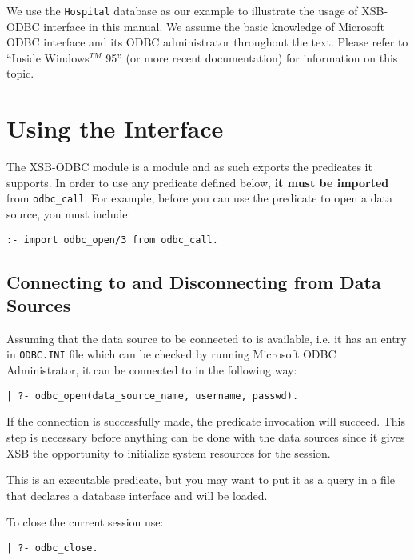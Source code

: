 We use the {\tt Hospital} database as our example to illustrate 
the usage of XSB-ODBC interface in this manual. We assume the basic 
knowledge of Microsoft ODBC interface and its ODBC administrator 
throughout the text.  Please refer to ``Inside Windows$^{TM}$ 95''
(or more recent documentation) for information on this topic.

\section{Using the Interface}

The XSB-ODBC module is a module and as such exports the predicates it
supports.  In order to use any predicate defined below, {\bf it must be
imported} from {\tt odbc\_call}.  For example, before you can use the
predicate to open a data source, you must include:

\begin{verbatim}
:- import odbc_open/3 from odbc_call.
\end{verbatim}

\subsection{Connecting to and Disconnecting from Data Sources}

Assuming that the data source to be connected to is available, i.e. it has an 
entry in {\tt ODBC.INI} file which can be checked by running Microsoft 
ODBC Administrator, it can be connected to in the following way: 

\begin{verbatim}
| ?- odbc_open(data_source_name, username, passwd).
\end{verbatim}

If the connection is successfully made, the predicate invocation will
succeed.  This step is necessary before anything can be done with the
data sources since it gives XSB the opportunity to initialize system
resources for the session.

This is an executable predicate, but you may want to put it as a query
in a file that declares a database interface and will be loaded.

To close the current session use:
\begin{verbatim}
| ?- odbc_close.
\end{verbatim}

